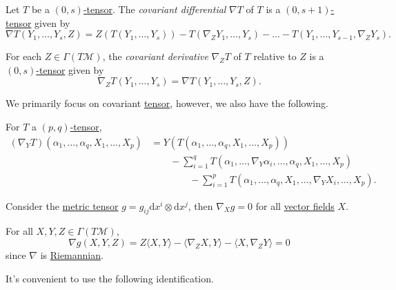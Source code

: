 \begin{definition}\label{def:tensor-covariant-differential}
	Let \(T\) be a \hyperref[def:tensor]{\((0,s)\)-tensor}. The \emph{covariant differential} \(\nabla T\) of \(T\) is a \hyperref[def:tensor]{\((0, s+1)\)-tensor} given by
	\[
		\nabla T(Y_1, \dots , Y_s, Z)
		= Z(T(Y_1, \dots , Y_s)) - T(\nabla _Z Y_1, \dots , Y_s) - \dots - T(Y_1, \dots , Y_{s-1}, \nabla _Z Y_s).
	\]
\end{definition}

\begin{definition}\label{def:tensor-covariant-derivative}
	For each \(Z\in \Gamma (T \mathcal{M} )\), the \emph{covariant derivative} \(\nabla _Z T\) of \(T\) relative to \(Z\) is a \hyperref[def:tensor]{\((0, s)\)-tensor} given by
	\[
		\nabla _Z T(Y_1, \dots , Y_s) = \nabla T (Y_1, \dots , Y_s , Z).
	\]
\end{definition}

We primarily focus on covariant \hyperref[def:tensor]{tensor}, however, we also have the following.

\begin{remark}
	For \(T\) a \hyperref[def:tensor]{\((p, q)\)-tensor},
	\[
		\begin{split}
			(\nabla _Y T) ( \alpha _1, \dots , \alpha _q, X_1, \dots , X_p)
			&= Y(T(\alpha _1, \dots , \alpha _q, X_1, \dots , X_p))\\
			&\qquad - \sum_{i=1}^{q} T(\alpha _1, \dots , \nabla _Y \alpha _i, \dots , \alpha _q , X_1, \dots , X_p)\\
			&\qquad\qquad - \sum_{i=1}^{p} T(\alpha _1, \dots , \alpha _q, X_1, \dots , \nabla _Y X_i, \dots , X_p).
		\end{split}
	\]
\end{remark}

\begin{eg}
	Consider the \hyperref[def:Riemannian-metric]{metric tensor} \(g = g_{ij} \mathrm{d} x^i \otimes \mathrm{d} x^j\), then \(\nabla _X g = 0\) for all \hyperref[def:vector-field]{vector fields} \(X\).
\end{eg}
\begin{explanation}
	For all \(X, Y, Z\in \Gamma (T \mathcal{M} )\),
	\[
		\nabla g(X, Y, Z) = Z \langle X, Y \rangle - \langle \nabla _Z X , Y \rangle  - \langle X, \nabla _Z Y \rangle = 0
	\]
	since \(\nabla \) is \hyperref[def:Riemannian]{Riemannian}.
\end{explanation}

It's convenient to use the following identification.


